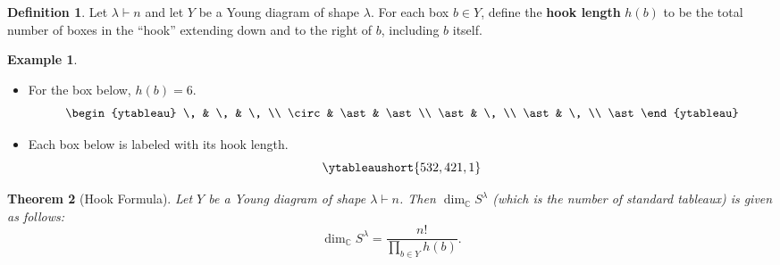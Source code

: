 \documentclass[12pt]{article}
\newcommand{\cx}{\mathbb{C}}
\newtheorem{theorem}{Theorem}[section]
\theoremstyle{definition}
\newtheorem{definition}[theorem]{Definition}
\newtheorem{example}{Example}[section]
\begin{document}
\begin{definition}
    Let $\lambda \vdash n$ and let $Y$ be a Young diagram of shape $\lambda$. For each box $b \in Y$, define the \textbf{hook length} $h(b)$ to be the total number of boxes in the ``hook'' extending down and to the right of $b$, including $b$ itself.
\end{definition}
\begin{example}
    \noindent
    \begin{itemize}
        \item For the box below, $h(b) = 6$.
        \begin{equation*}
            \begin{ytableau}
                \, & \, & \, \\
                \circ & \ast & \ast \\
                \ast & \, \\
                \ast & \, \\
                \ast
            \end{ytableau}
        \end{equation*}
        \item Each box below is labeled with its hook length.
        \begin{equation*}
            \ytableaushort{532,421,1}
        \end{equation*}
    \end{itemize}
\end{example}
\begin{theorem}[Hook Formula]
    Let $Y$ be a Young diagram of shape $\lambda \vdash n$. Then $\dim_{\cx} S^{\lambda}$ (which is the number of standard tableaux) is given as follows:
    \begin{equation}
        \dim_{\cx} S^{\lambda} = \frac{n!}{\prod\limits_{b \in Y} h(b) }.
    \end{equation}
\end{theorem}
\end{document}
